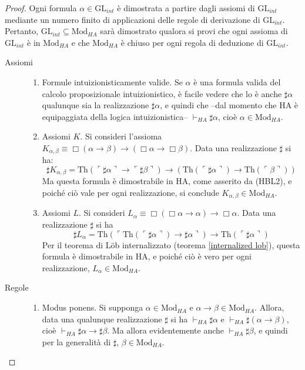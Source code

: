 \begin{proof}
Ogni formula $\alpha\in\ensuremath{\mathrm{GL}}_{int}$ è dimostrata a partire dagli assiomi di $\ensuremath{\mathrm{GL}}_{int}$ mediante un numero finito di applicazioni delle regole di derivazione di $\ensuremath{\mathrm{GL}}_{int}$. Pertanto, $\ensuremath{\mathrm{GL}}_{int}\subseteq\mathrm{Mod}_{HA}$ sarà dimostrato qualora si provi che ogni assioma di $\ensuremath{\mathrm{GL}}_{int}$ è in $\mathrm{Mod}_{HA}$ e che $\mathrm{Mod}_{HA}$ è chiuso per ogni regola di deduzione di $\ensuremath{\mathrm{GL}}_{int}$.
\begin{description}
\item[Assiomi]
\begin{enumerate}
\item Formule intuizionisticamente valide. Se $\alpha$ è una formula valida del calcolo proposizionale intuizionistico, è facile vedere che lo è anche $\sharp\alpha$ qualunque sia la realizzazione $\sharp\alpha$, e quindi che --dal momento che HA è equipaggiata della logica intuizionistica-- $\vdash_{HA}\sharp\alpha$, cioè $\alpha\in\mathrm{Mod}_{HA}$.
\item Assiomi $K$. Si consideri l'assioma $K_{\alpha,\beta}\equiv\Box(\alpha\to\beta)\to(\Box\alpha\to\Box\beta)$. Data una realizzazione $\sharp$ si ha:
    $$\sharp K_{\alpha,\beta}=\ensuremath{\mathrm{Th}}(\ulcorner\sharp\alpha\urcorner\to\ulcorner\sharp\beta\urcorner)
    \to(\ensuremath{\mathrm{Th}}(\ulcorner\sharp\alpha\urcorner)\to\ensuremath{\mathrm{Th}}(\ulcorner\beta\urcorner))$$
    Ma questa formula è dimostrabile in HA, come asserito da (HBL2), e poiché ciò vale per ogni realizzazione, si conclude $K_{\alpha,\beta}\in\mathrm{Mod}_{HA}$.
\item Assiomi $L$. Si consideri $L_{\alpha}\equiv\Box(\Box\alpha\to\alpha)\to\Box\alpha$. Data una realizzazione $\sharp$ si ha $$\sharp L_{\alpha}=\ensuremath{\mathrm{Th}}(\ulcorner\ensuremath{\mathrm{Th}}(\ulcorner\sharp\alpha\urcorner)\to\sharp\alpha\urcorner)\to\ensuremath{\mathrm{Th}}(\ulcorner\sharp\alpha\urcorner)$$
    Per il teorema di L\"ob internalizzato (teorema \ref{internalized lob}), questa formula è dimostrabile in HA, e poiché ciò è vero per ogni realizzazione, $L_\alpha\in\mathrm{Mod}_{HA}$.
\end{enumerate}
\item[Regole]
\begin{enumerate}
\item Modus ponens. Si supponga $\alpha\in\mathrm{Mod}_{HA}$ e $\alpha\to\beta\in\mathrm{Mod}_{HA}$. Allora, data una qualunque realizzazione $\sharp$ si ha $\vdash_{HA}\sharp\alpha$ e $\vdash_{HA}\sharp(\alpha\to\beta)$, cioè $\vdash_{HA}\sharp\alpha\to\sharp\beta$. Ma allora evidentemente anche $\vdash_{HA}\sharp\beta$, e quindi per la generalità di $\sharp$, $\beta\in\mathrm{Mod}_{HA}$.

\end{enumerate}
\end{description}
\end{proof}
